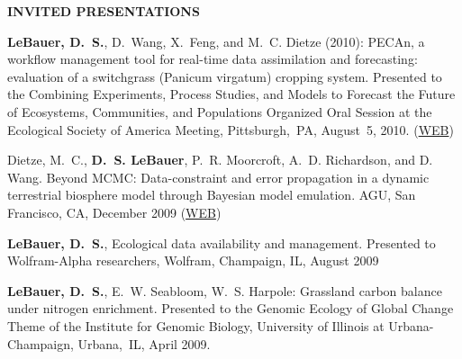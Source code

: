 \documentclass[10pt,twoside]{article}
\begin{document}
\textbf{INVITED PRESENTATIONS}
\begin{itemize*}

\item \textbf{LeBauer, D.~S.}, D.~Wang, X.~Feng, and M.~C. Dietze (2010):
PECAn, a workflow management tool for real-time data assimilation and forecasting: evaluation of a switchgrass (Panicum virgatum) cropping system.
Presented to the Combining Experiments, Process Studies, and Models to Forecast the Future of Ecosystems, Communities, and Populations Organized Oral Session at the Ecological Society of America Meeting,
Pittsburgh,~PA, August~5, 2010.
\ifpdf %
(\href{http://eco.confex.com/eco/2010/techprogram/S5662.HTM}{WEB})
\fi %
\item Dietze, M.~C., \textbf{D.~S. LeBauer}, P.~R. Moorcroft, A.~D. Richardson, and D. Wang. Beyond MCMC: Data-constraint and error propagation in a dynamic terrestrial biosphere model through Bayesian model emulation. AGU, San Francisco, CA, December 2009
\ifpdf %
(\href{http://adsabs.harvard.edu/abs/2009AGUFM.B44A..02D}{WEB})
\fi %
\item \textbf{LeBauer, D.~S.}, Ecological data availability and management. Presented to Wolfram-Alpha researchers, Wolfram, Champaign, IL, August 2009
\item \textbf{LeBauer, D.~S.}, E.~W. Seabloom, W.~S. Harpole:
Grassland carbon balance under nitrogen enrichment.
Presented to the Genomic Ecology of Global Change Theme of the Institute for Genomic Biology, University of Illinois at Urbana-Champaign, 
Urbana,~IL, April 2009.
\end{itemize*}
\end{document}
